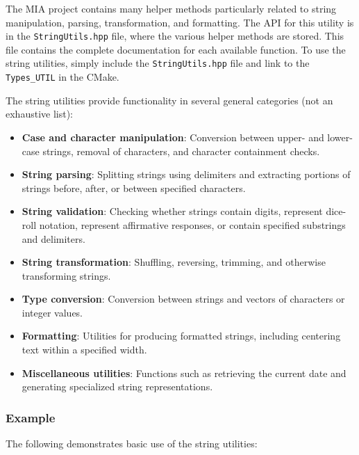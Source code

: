 The MIA project contains many helper methods particularly related to string manipulation, parsing, transformation, and formatting. The API for this utility is in the \texttt{StringUtils.hpp} file, where the various helper methods are stored. This file contains the complete documentation for each available function. To use the string utilities, simply include the \texttt{StringUtils.hpp} file and link to the \texttt{Types\_UTIL} in the CMake.

The string utilities provide functionality in several general categories (not an exhaustive list):
\begin{itemize}
	\item \textbf{Case and character manipulation}: Conversion between upper- and lower-case strings, removal of characters, and character containment checks.
	
	\item \textbf{String parsing}: Splitting strings using delimiters and extracting portions of strings before, after, or between specified characters.
	
	\item \textbf{String validation}:  Checking whether strings contain digits, represent dice-roll notation, represent affirmative responses, or contain specified substrings and delimiters.
	
	\item \textbf{String transformation}: Shuffling, reversing, trimming, and otherwise transforming strings.
	
	\item \textbf{Type conversion}: Conversion between strings and vectors of characters or integer values.
	
	\item \textbf{Formatting}: Utilities for producing formatted strings, including centering text within a specified width.
	
	\item \textbf{Miscellaneous utilities}: Functions such as retrieving the current date and generating specialized string representations.
\end{itemize}

\subsubsection{Example}

The following demonstrates basic use of the string utilities:


